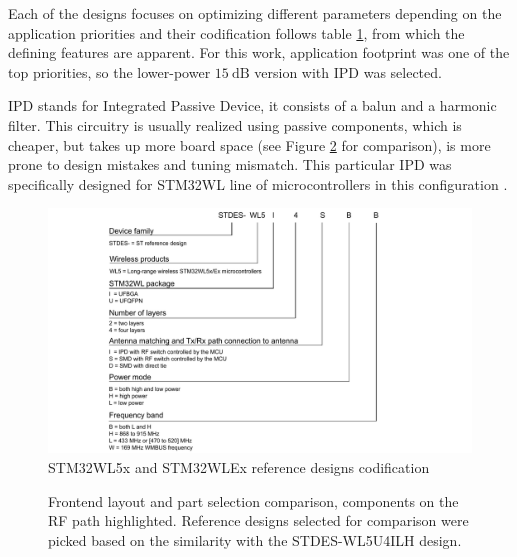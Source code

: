 Each of the designs focuses on optimizing different parameters depending on the application priorities and their codification follows table \ref{fig:reference-design-codification}, from which the defining features are apparent. For this work, application footprint was one of the top priorities, so the lower-power $15~\mathrm{dB}$ version with IPD was selected.

IPD stands for Integrated Passive Device, it consists of a balun and a harmonic filter. This circuitry is usually realized using passive components, which is cheaper, but takes up more board space (see Figure \ref{fig:frontend-comparison} for comparison), is more prone to design mistakes and tuning mismatch. This particular IPD was specifically designed for STM32WL line of microcontrollers in this configuration \cite{stmicroelectronics_balfhb-wl-05d3_2024}.

\begin{figure}
    \includegraphics[width=\textwidth]{fig/STDES-xxxxxxx.png}
    \caption{\label{fig:reference-design-codification} STM32WL5x and STM32WLEx reference designs codification}
\end{figure}

\begin{figure}
    \centering
    \hfil
    \hfil
    \caption{\label{fig:frontend-comparison} Frontend layout and part selection comparison, components on the RF path highlighted. Reference designs selected for comparison were picked based on the similarity with the STDES-WL5U4ILH design.}
\end{figure}


